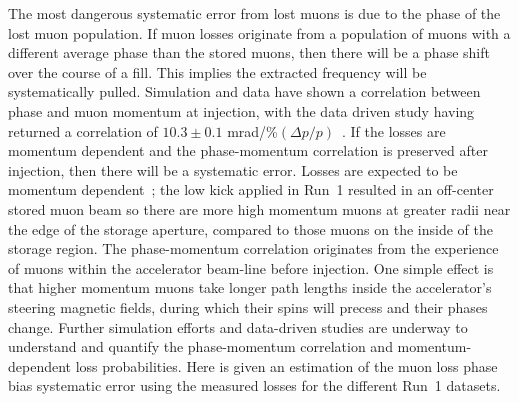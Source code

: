 The most dangerous systematic error from lost muons is due to the \gmtwo phase of the lost muon population. If muon losses originate from a population of muons with a different average phase than the stored muons, then there will be a phase shift over the course of a fill. This implies the extracted \wa frequency will be systematically pulled. Simulation and data have shown a correlation between \gmtwo phase and muon momentum at injection, with the data driven study having returned a correlation of $10.3 \pm 0.1$ mrad/\%$(\Delta p/p)$~\cite{HannahLossStudyFinal}. If the losses are momentum dependent and the phase-momentum correlation is preserved after injection, then there will be a systematic error. Losses are expected to be momentum dependent~\cite{MikeLosses}; the low kick applied in Run~1 resulted in an off-center stored muon beam so there are more high momentum muons at greater radii near the edge of the storage aperture, compared to those muons on the inside of the storage region. The phase-momentum correlation originates from the experience of muons within the accelerator beam-line before injection. One simple effect is that higher momentum muons take longer path lengths inside the accelerator's steering magnetic fields, during which their spins will precess and their \gmtwo phases change. Further simulation efforts and data-driven studies are underway to understand and quantify the phase-momentum correlation and momentum-dependent loss probabilities. Here is given an estimation of the muon loss phase bias systematic error using the measured losses for the different Run~1 datasets.




